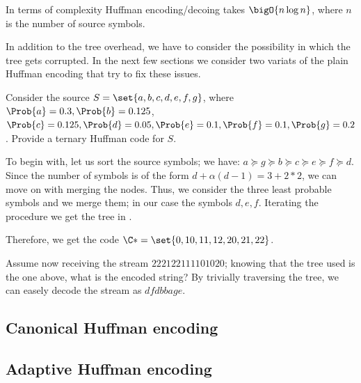 \documentclass{subfiles}
\begin{document}
    In terms of complexity Huffman encoding/decoing takes \(\bigO{n \log n}\),
        where \(n\) is the number of source symbols. 

    In addition to the tree overhead, we have to consider the possibility in 
        which the tree gets corrupted. In the next few sections we consider two
        variats of the plain Huffman encoding that try to fix these issues.

    \clearpage
    \begin{example*}
        Consider the source \(S = \set{a, b, c, d, e, f, g}\), 
            where \(\Prob{a} = 0.3, \Prob{b} = 0.125\), \(\Prob{c} = 0.125, 
            \Prob{d} = 0.05, \Prob{e} = 0.1, \Prob{f} = 0.1, \Prob{g} = 0.2\).
            Provide a ternary Huffman code for \(S\).

        To begin with, let us sort the source symbols; we have: \(a \succeq g \succeq b
            \succeq c \succeq e \succeq f \succeq d\). Since the number of symbols
            is of the form \(d + \alpha(d - 1) = 3 + 2*2\), we can move on with merging the nodes.
            Thus, we consider the three least probable symbols and we merge them;
            in our case the symbols \(d, e, f\). 
            Iterating the procedure we get the tree in .

            

        Therefore, we get the code \(\C* = \set{0, 10, 11, 12, 20, 21, 22}\).

        Assume now receiving the stream \(22 21 22 11 11 0 10 20\); 
            knowing that the tree used is the one above, what is the encoded string?
            By trivially traversing the tree, we can easely decode the stream as 
            \(dfdbbage\).
    \end{example*}

    \subsection{Canonical Huffman encoding}
    

    \subsection{Adaptive Huffman encoding}
    

    \nocite{huffman1952}
\end{document}
